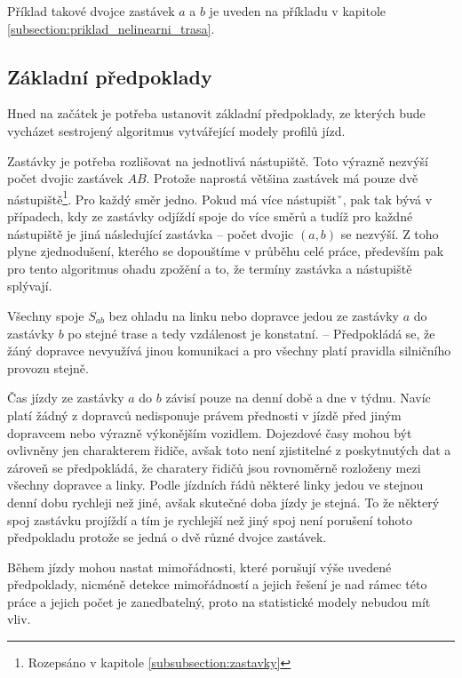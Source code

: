 \bigbreak

Příklad takové dvojce zastávek $a$ a $b$ je uveden na příkladu v kapitole \ref{subsection:priklad_nelinearni_trasa}.

\subsection{Základní předpoklady} \label{section:zakladni_predpoklady}

Hned na začátek je potřeba ustanovit základní předpoklady, ze kterých bude vycházet sestrojený algoritmus vytvářející modely profilů jízd.

\bigbreak

Zastávky je potřeba rozlišovat na jednotlivá nástupiště. Toto výrazně nezvýší počet dvojic zastávek $AB$. Protože naprostá většina zastávek má pouze dvě nástupiště\footnote{Rozepsáno v kapitole \ref{subsubsection:zastavky}}. Pro každý směr jedno. Pokud má více nástupištˇ, pak tak bývá v případech, kdy ze zastávky odjíždí spoje do více směrů a tudíž pro každné nástupiště je jiná následující zastávka -- počet dvojic $(a, b)$ se nezvýší. Z toho plyne zjednodušení, kterého se dopouštíme v průběhu celé práce, především pak pro tento algoritmus ohadu zpožění a to, že termíny zastávka a nástupiště splývají.

\bigbreak

Všechny spoje $S_{ab}$ bez ohladu na linku nebo dopravce jedou ze zastávky $a$ do zastávky $b$ po stejné trase a tedy vzdálenost je konstatní. -- Předpokládá se, že žáný dopravce nevyužívá jinou komunikaci a pro všechny platí pravidla silničního provozu stejně.

\bigbreak

Čas jízdy ze zastávky $a$ do $b$ závisí pouze na denní době a dne v týdnu. Navíc platí žádný z dopravců nedisponuje právem přednosti v jízdě před jiným dopravcem nebo výrazně výkonějším vozidlem.  Dojezdové časy mohou být ovlivněny jen charakterem řidiče, avšak toto není zjistitelné z poskytnutých dat a zároveň se předpokládá, že charatery řidičů jsou rovnoměrně rozloženy mezi všechny dopravce a linky. Podle jízdních řádů některé linky jedou ve stejnou denní dobu rychleji než jiné, avšak skutečné doba jízdy je stejná. To že některý spoj zastávku projíždí a tím je rychlejší než jiný spoj není porušení tohoto předpokladu protože se jedná o dvě různé dvojce zastávek.

\bigbreak

Během jízdy mohou nastat mimořádnosti, které porušují výše uvedené předpoklady, nicméně detekce mimořádností a jejich řešení je nad rámec této práce a jejich počet je zanedbatelný, proto na statistické modely nebudou mít vliv.

